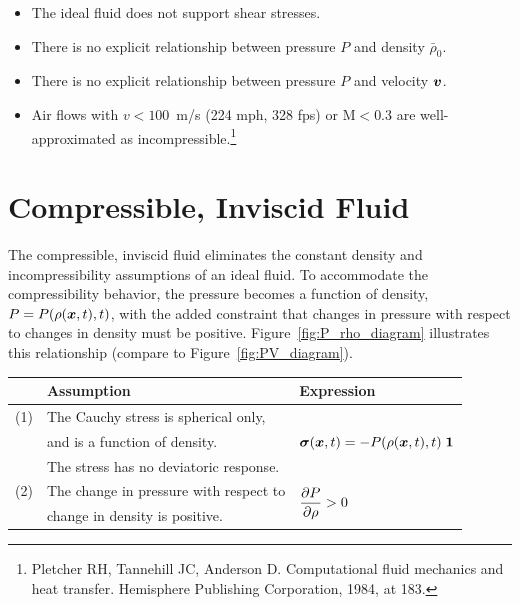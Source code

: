 \begin{Hremark}
\begin{itemize}[noitemsep]
\item The ideal fluid does not support shear stresses.
\item There is no explicit relationship between pressure $P$ and 
density $\bar\rho_0$.
\item There is no explicit relationship between pressure $P$ and 
velocity $\mbox{\boldmath $v$}$.
\item Air flows with $v < 100$~m/s (224 mph, 328 fps) or $\mbox{M} < 0.3$ 
are well-approximated
as incompressible.\footnote{
Pletcher RH, Tannehill JC, Anderson D. 
Computational fluid mechanics and heat transfer. 
Hemisphere Publishing Corporation, 1984, at 183.}
\end{itemize}
\end{Hremark}

\section{Compressible, Inviscid Fluid}
The compressible, inviscid fluid eliminates the constant density and 
incompressibility
assumptions of an ideal fluid.
To accommodate the compressibility behavior, the pressure becomes a function
of density, $P = P(\rho(\mbox{\boldmath $x$}, t), t)$, with the added constraint that
changes in pressure with respect to changes in density must be positive.
Figure~\ref{fig:P_rho_diagram} 
illustrates this relationship
(compare to Figure~\ref{fig:PV_diagram}).
\be
\begin{tabular}{cl|l}
 &
 {\bf Assumption} 
 & 
 {\bf Expression}  \\ \hline \hline
 (1) 
 & 
 The Cauchy stress is spherical only, 
 & 
 \multirow{ 3}{*}{$\vsigma(\vx, t) = - P(\rho(\vx, t),t) \; \vid$} \\
 
 &
 and is a function of density. 
 & 
 \\
 
 &
 The stress has no deviatoric response.
 & 
 \\ \hline
 (2)
 & 
 The change in pressure with respect to  
 &
 \multirow{ 2}{*}{$\dst\frac{\partial P}{\partial \rho} > 0$}
 \\
 &
 change in density is positive.
 & 
\end{tabular}
\label{eq:compressible_inviscid}
\ee


